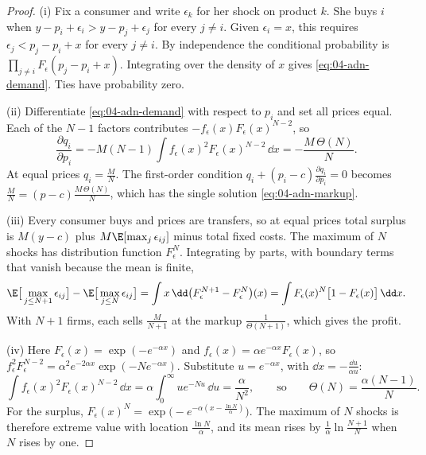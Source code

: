 \begin{proof}
(i) Fix a consumer and write $\epsilon_k$ for her shock on product $k$. She buys $i$ when
$y - p_i + \epsilon_i > y - p_j + \epsilon_j$ for every $j \ne i$. Given $\epsilon_i = x$, this requires
$\epsilon_j < p_j - p_i + x$ for every $j \ne i$. By independence the conditional probability is
$\prod_{j \ne i}F_\epsilon(p_j - p_i + x)$. Integrating over the density of $x$ gives \eqref{eq:04-adn-demand}. Ties
have probability zero.

(ii) Differentiate \eqref{eq:04-adn-demand} with respect to $p_i$ and set all prices equal. Each of the $N - 1$ factors
contributes $-f_\epsilon(x)F_\epsilon(x)^{N-2}$, so
\begin{equation*}
\frac{\partial q_i}{\partial p_i} = -M(N - 1)\int f_\epsilon(x)^2F_\epsilon(x)^{N-2}\,\dd x = -\frac{M\,\Theta(N)}{N} .
\end{equation*}
At equal prices $q_i = \frac{M}{N}$. The first-order condition $q_i + (p_i - c)\frac{\partial q_i}{\partial p_i} = 0$
becomes $\frac{M}{N} = (p - c)\frac{M\,\Theta(N)}{N}$, which has the single solution \eqref{eq:04-adn-markup}.

(iii) Every consumer buys and prices are transfers, so at equal prices total surplus is $M(y - c)$ plus
$M\E[\max_j\epsilon_{ij}]$ minus total fixed costs. The maximum of $N$ shocks has distribution function $F_\epsilon^N$.
Integrating by parts, with boundary terms that vanish because the mean is finite,
\begin{equation*}
\E\big[\max_{j \le N + 1}\epsilon_{ij}\big] - \E\big[\max_{j \le N}\epsilon_{ij}\big]
= \int x\,\dd\big(F_\epsilon^{N+1} - F_\epsilon^N\big)(x) = \int F_\epsilon(x)^N\big[1 - F_\epsilon(x)\big]\,\dd x .
\end{equation*}
With $N + 1$ firms, each sells $\frac{M}{N + 1}$ at the markup $\frac{1}{\Theta(N + 1)}$, which gives the profit.

(iv) Here $F_\epsilon(x) = \exp(-e^{-\alpha x})$ and $f_\epsilon(x) = \alpha e^{-\alpha x}F_\epsilon(x)$, so
$f_\epsilon^2F_\epsilon^{N-2} = \alpha^2e^{-2\alpha x}\exp(-Ne^{-\alpha x})$. Substitute $u = e^{-\alpha x}$, with
$\dd x = -\frac{\dd u}{\alpha u}$:
\begin{equation*}
\int f_\epsilon(x)^2F_\epsilon(x)^{N-2}\,\dd x = \alpha\int_0^\infty ue^{-Nu}\,\dd u = \frac{\alpha}{N^2},
\qquad\text{so}\qquad
\Theta(N) = \frac{\alpha(N - 1)}{N} .
\end{equation*}
For the surplus, $F_\epsilon(x)^N = \exp\big(-e^{-\alpha(x - \frac{\ln N}{\alpha})}\big)$. The maximum of $N$ shocks is
therefore extreme value with location $\frac{\ln N}{\alpha}$, and its mean rises by $\frac{1}{\alpha}\ln\frac{N + 1}{N}$
when $N$ rises by one.


\end{proof}
